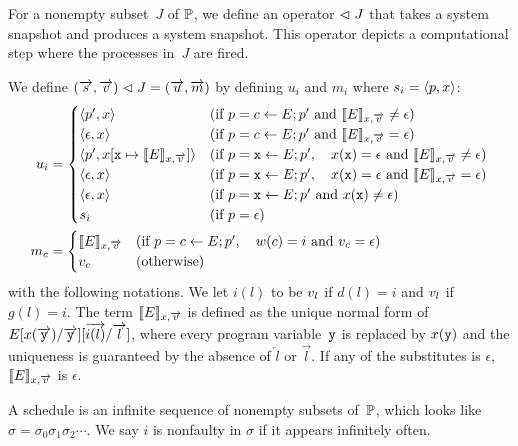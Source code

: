 {For a nonempty subset~$J$ of $\mathbb{P}$, we define an operator $\vartriangleleft J$ that
takes a system snapshot and produces a system snapshot.
This operator depicts a computational step where the processes in~$J$
are fired.

We define $
(\overrightarrow s, \overrightarrow v) \vartriangleleft J = (\overrightarrow u, \overrightarrow m)
$ by defining
$u_i$ and $m_i$
where $s_i = \langle{p,x}\rangle$:
\begin{align*}
 u_i & =
 \begin{cases}
 \langle{p',x}\rangle  & (\text{if } p = c
 \leftarrow E; p' \text{ and }\llbracket{E}\rrbracket_{x,\overrightarrow v} \neq \epsilon)
 \\
 \langle{\epsilon,x}\rangle  & (\text{if } p = c
 \leftarrow E; p' \text{ and }\llbracket{E}\rrbracket_{x,\overrightarrow v} = \epsilon)
 \\
 \langle{p', x[\texttt{x} \mapsto \llbracket{E}\rrbracket_{x, \overrightarrow v}]}\rangle&
                       (\text{if } p = \texttt{x} \leftarrow E; p', \quad
 x(\texttt{x}) = \epsilon  \text{ and } \llbracket{E}\rrbracket_{x, \overrightarrow v} \neq \epsilon) \\
 \langle{\epsilon, x}\rangle&
                      (\text{if } p = \texttt{x} \leftarrow E; p',  \quad
 x(\texttt{x}) = \epsilon  \text{ and } \llbracket{E}\rrbracket_{x, \overrightarrow v} = \epsilon) \\
 \langle{\epsilon, x}\rangle & (\text{if } p = \texttt{x} \leftarrow E; p' \text{
 and }
 x(\texttt{x}) \neq \epsilon) \\
 s_i & (\text{if } p = \epsilon)
 \end{cases}\\
 {m}_{c} & =
 \begin{cases}
 \llbracket{E}\rrbracket_{x, \overrightarrow v} & (\text{if } p = c \leftarrow E; p',\quad w(c)= i \text{
 and } {v}_{c} = \epsilon) \\
 {v}_{c} &(\text{otherwise})
 \end{cases}\\
\end{align*}
with the following notations.
We let $i(l)$ to be ${v}_{l}$ if $d(l)=i$ and
${v}_{l}$ if $g(l) = i$.
The term
$\llbracket{E}\rrbracket_{x, \overrightarrow v}$ is defined as the unique normal form
of $E[x(\overrightarrow{\texttt{y}}) / \overrightarrow{\texttt{y}}][\overrightarrow{i(l)}/\overrightarrow l]$, where
every program variable~$\texttt{y}$ is replaced by $x(\texttt{y})$ and the
uniqueness is guaranteed by the absence of $\overleftarrow l$ or
$\overrightarrow l$.
If any of the substitutes is $\epsilon$,
$\llbracket{E}\rrbracket_{x, \overrightarrow v}$ is $\epsilon$.

A schedule is an infinite sequence of nonempty subsets of~$\mathbb{P}$,
which looks like $\sigma = \sigma_0\sigma_1\sigma_2\cdots$.
We say $i$ is nonfaulty in $\sigma$
if it appears infinitely often.

}
